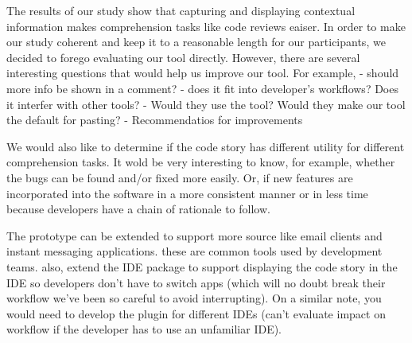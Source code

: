 \documentclass[../manifest.tex]{subfiles}
\begin{document}
The results of our study show that capturing and displaying contextual information makes comprehension tasks like code reviews eaiser. In order to make our study coherent and keep it to a reasonable length for our participants, we decided to forego evaluating our tool directly. However, there are several interesting questions that would help us improve our tool. For example,
  - should more info be shown in a comment?
  - does it fit into developer's workflows? Does it interfer with other tools?
  - Would they use the tool? Would they make our tool the default for pasting?
  - Recommendatios for improvements

We would also like to determine if the code story has different utility for different comprehension tasks. It wold be very interesting to know, for example, whether the bugs can be found and/or fixed more easily. Or, if new features are incorporated into the software in a more consistent manner or in less time because developers have a chain of rationale to follow.

The prototype can be extended to support more source like email clients and instant messaging applications. these are common tools used by development teams. also, extend the IDE package to support displaying the code story in the IDE so developers don't have to switch apps (which will no doubt break their workflow we've been so careful to avoid interrupting). On a similar note, you would need to develop the plugin for different IDEs (can't evaluate impact on workflow if the developer has to use an unfamiliar IDE).
\end{document}
